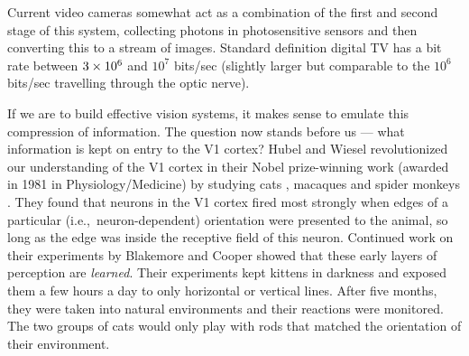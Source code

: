 Current video cameras somewhat act as a combination of the first and second
stage of this system, collecting photons in photosensitive sensors and then
converting this to a stream of images. Standard definition digital TV has
a bit rate between $3\times 10^6$ and $10^7$ bits/sec (slightly larger but comparable
to the $10^6$ bits/sec travelling through the optic nerve).

If we are to build effective vision systems, it makes sense to emulate this
compression of information.
The question now stands before us --- what information is kept on entry to the V1 cortex?
Hubel and Wiesel revolutionized our understanding of the V1 cortex in their Nobel prize-winning work
(awarded in 1981 in Physiology/Medicine) by
studying cats \cite{hubel_receptive_1959, hubel_receptive_1962}, macaques and spider 
monkeys \cite{hubel_receptive_1968}. They found that neurons in the V1 cortex fired
most strongly when edges of a particular (i.e.,\ neuron-dependent) orientation
were presented to the animal, so long as the edge was inside the receptive field of
this neuron.
Continued work on their experiments by Blakemore and Cooper
\cite{blakemore_development_1970} showed that these early layers of perception
are \emph{learned}. Their experiments kept kittens in darkness and exposed
them a few hours a day to only horizontal or vertical lines. After five months, they were
taken into natural environments and their reactions were monitored. The two groups of cats
would only play with rods that matched the orientation of their environment.

